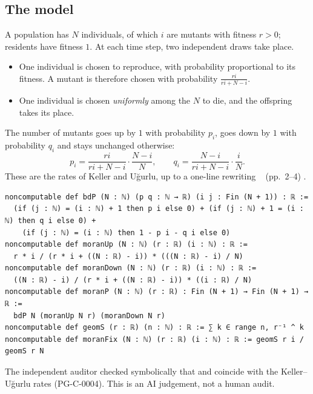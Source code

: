 \subsection{The model}
A population has $N$ individuals, of which $i$ are mutants with fitness $r>0$; residents have
fitness $1$. At each time step, two independent draws take place.
\begin{itemize}[itemsep=1pt]
\item One individual is chosen to reproduce, with probability proportional to its fitness. A
mutant is therefore chosen with probability $\frac{ri}{ri+N-i}$.
\item One individual is chosen \emph{uniformly} among the $N$ to die, and the offspring takes its place.
\end{itemize}
The number of mutants goes up by $1$ with probability $p_i$, goes down by $1$ with probability $q_i$ and stays
unchanged otherwise:
\[
p_i=\frac{ri}{ri+N-i}\cdot\frac{N-i}{N},\qquad q_i=\frac{N-i}{ri+N-i}\cdot\frac iN .
\]
These are the rates of Keller and Uğurlu, up to a one-line rewriting \tierL{}~\cite{ch4:KU} (pp.~2--4) \tierC.

\begin{leanbox}
\begin{lstlisting}[language=Lean]
noncomputable def bdP (N : ℕ) (p q : ℕ → ℝ) (i j : Fin (N + 1)) : ℝ :=
  (if (j : ℕ) = (i : ℕ) + 1 then p i else 0) + (if (j : ℕ) + 1 = (i : ℕ) then q i else 0) +
    (if (j : ℕ) = (i : ℕ) then 1 - p i - q i else 0)
noncomputable def moranUp (N : ℕ) (r : ℝ) (i : ℕ) : ℝ :=
  r * i / (r * i + ((N : ℝ) - i)) * (((N : ℝ) - i) / N)
noncomputable def moranDown (N : ℕ) (r : ℝ) (i : ℕ) : ℝ :=
  ((N : ℝ) - i) / (r * i + ((N : ℝ) - i)) * ((i : ℝ) / N)
noncomputable def moranP (N : ℕ) (r : ℝ) : Fin (N + 1) → Fin (N + 1) → ℝ :=
  bdP N (moranUp N r) (moranDown N r)
noncomputable def geomS (r : ℝ) (n : ℕ) : ℝ := ∑ k ∈ range n, r⁻¹ ^ k
noncomputable def moranFix (N : ℕ) (r : ℝ) (i : ℕ) : ℝ := geomS r i / geomS r N
\end{lstlisting}
The independent auditor checked symbolically that  and  coincide with the
Keller--Uğurlu rates (PG-C-0004). This is an AI judgement, not a human audit.
\end{leanbox}

